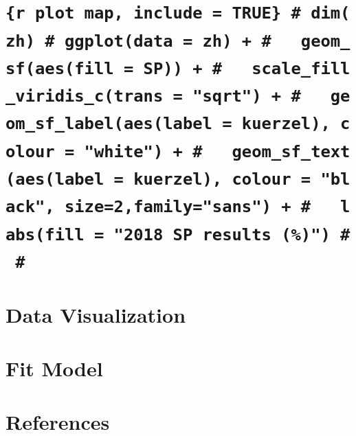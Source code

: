 \documentclass[
]{article}
\begin{document}
\hypertarget{r-plot-map-include-true-dimzh-ggplotdata-zh-geom_sfaesfill-sp-scale_fill_viridis_ctrans-sqrt-geom_sf_labelaeslabel-kuerzel-colour-white-geom_sf_textaeslabel-kuerzel-colour-black-size2familysans-labsfill-2018-sp-results}{%
\section{\texorpdfstring{\texttt{\{r\ plot\ map,\ include\ =\ TRUE\}\ \#\ dim(zh)\ \#\ ggplot(data\ =\ zh)\ +\ \#\ \ \ geom\_sf(aes(fill\ =\ SP))\ +\ \#\ \ \ scale\_fill\_viridis\_c(trans\ =\ "sqrt")\ +\ \#\ \ \ geom\_sf\_label(aes(label\ =\ kuerzel),\ colour\ =\ "white")\ +\ \#\ \ \ geom\_sf\_text(aes(label\ =\ kuerzel),\ colour\ =\ "black",\ size=2,family="sans")\ +\ \#\ \ \ labs(fill\ =\ "2018\ SP\ results\ (\%)")\ \#\ \#}}{\{r plot map, include = TRUE\} \# dim(zh) \# ggplot(data = zh) + \#   geom\_sf(aes(fill = SP)) + \#   scale\_fill\_viridis\_c(trans = "sqrt") + \#   geom\_sf\_label(aes(label = kuerzel), colour = "white") + \#   geom\_sf\_text(aes(label = kuerzel), colour = "black", size=2,family="sans") + \#   labs(fill = "2018 SP results (\%)") \# \#}}\label{r-plot-map-include-true-dimzh-ggplotdata-zh-geom_sfaesfill-sp-scale_fill_viridis_ctrans-sqrt-geom_sf_labelaeslabel-kuerzel-colour-white-geom_sf_textaeslabel-kuerzel-colour-black-size2familysans-labsfill-2018-sp-results}}

\pagebreak

\hypertarget{data-visualization}{%
\section{Data Visualization}\label{data-visualization}}

\pagebreak

\hypertarget{fit-model}{%
\section{Fit Model}\label{fit-model}}

\pagebreak

\hypertarget{references}{%
\section{References}\label{references}}
\end{document}
